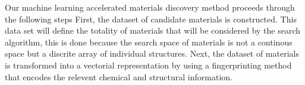 

Our machine learning accelerated materials discovery method proceeds through the following steps
%
First, the dataset of candidate materials is constructed.
%
This data set will define the totality of materials that will be considered by the search algorithm,
this is done because the search space of materials is not a continous space but a discrite array of individual structures.
%
Next, the dataset of materials is transformed into a vectorial representation by using a fingerprinting method that encodes the relevent chemical and structural information.
%



